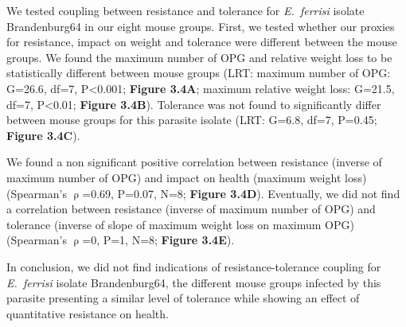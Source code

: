 We tested coupling between resistance and tolerance for \textit{E.~ferrisi} isolate Brandenburg64 in our eight mouse groups. First, we tested whether our proxies for resistance, impact on weight and tolerance were different between the mouse groups. We found the maximum number of OPG and relative weight loss to be statistically different between mouse groups (LRT: maximum number of OPG: G=26.6, df=7, P<0.001; \textbf{Figure 3.4A}; maximum relative weight loss: G=21.5, df=7, P<0.01; \textbf{Figure 3.4B}). Tolerance was not found to significantly differ between mouse groups for this parasite isolate (LRT: G=6.8, df=7, P=0.45; \textbf{Figure 3.4C}).\par

We found a non significant positive correlation between resistance (inverse of maximum number of OPG) and impact on health (maximum weight loss) (Spearman's $\uprho$=0.69, P=0.07, N=8; \textbf{Figure 3.4D}). Eventually, we did not find a correlation between resistance (inverse of maximum number of OPG) and tolerance (inverse of slope of maximum weight loss on maximum OPG) (Spearman's $\uprho$=0, P=1, N=8; \textbf{Figure 3.4E}). \par

In conclusion, we did not find indications of resistance-tolerance coupling for \textit{E.~ferrisi} isolate Brandenburg64, the different mouse groups infected by this parasite presenting a similar level of tolerance while showing an effect of quantitative resistance on health.\par

